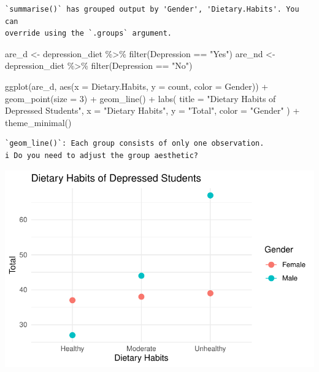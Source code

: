 \documentclass[
  letterpaper,
  DIV=11,
  numbers=noendperiod]{scrartcl}
\newenvironment{Shaded}{\begin{snugshade}}{\end{snugshade}}
\newcommand{\AttributeTok}[1]{\textcolor[rgb]{0.40,0.45,0.13}{#1}}
\newcommand{\DecValTok}[1]{\textcolor[rgb]{0.68,0.00,0.00}{#1}}
\newcommand{\FunctionTok}[1]{\textcolor[rgb]{0.28,0.35,0.67}{#1}}
\newcommand{\NormalTok}[1]{\textcolor[rgb]{0.00,0.23,0.31}{#1}}
\newcommand{\OtherTok}[1]{\textcolor[rgb]{0.00,0.23,0.31}{#1}}
\newcommand{\SpecialCharTok}[1]{\textcolor[rgb]{0.37,0.37,0.37}{#1}}
\newcommand{\StringTok}[1]{\textcolor[rgb]{0.13,0.47,0.30}{#1}}
\begin{document}
\begin{verbatim}
`summarise()` has grouped output by 'Gender', 'Dietary.Habits'. You can
override using the `.groups` argument.
\end{verbatim}

\begin{Shaded}
\begin{Highlighting}[]
\NormalTok{are\_d }\OtherTok{\textless{}{-}}\NormalTok{ depression\_diet }\SpecialCharTok{\%\textgreater{}\%} \FunctionTok{filter}\NormalTok{(Depression }\SpecialCharTok{==} \StringTok{"Yes"}\NormalTok{)}
\NormalTok{are\_nd }\OtherTok{\textless{}{-}}\NormalTok{ depression\_diet }\SpecialCharTok{\%\textgreater{}\%} \FunctionTok{filter}\NormalTok{(Depression }\SpecialCharTok{==} \StringTok{"No"}\NormalTok{)}

\FunctionTok{ggplot}\NormalTok{(are\_d, }\FunctionTok{aes}\NormalTok{(}\AttributeTok{x =}\NormalTok{ Dietary.Habits, }\AttributeTok{y =}\NormalTok{ count, }\AttributeTok{color =}\NormalTok{ Gender)) }\SpecialCharTok{+}
  \FunctionTok{geom\_point}\NormalTok{(}\AttributeTok{size =} \DecValTok{3}\NormalTok{) }\SpecialCharTok{+}    
  \FunctionTok{geom\_line}\NormalTok{() }\SpecialCharTok{+}       
  \FunctionTok{labs}\NormalTok{(}
    \AttributeTok{title =} \StringTok{"Dietary Habits of Depressed Students"}\NormalTok{,}
    \AttributeTok{x =} \StringTok{"Dietary Habits"}\NormalTok{,}
    \AttributeTok{y =} \StringTok{"Total"}\NormalTok{,}
    \AttributeTok{color =} \StringTok{"Gender"}
\NormalTok{  ) }\SpecialCharTok{+}
  \FunctionTok{theme\_minimal}\NormalTok{() }
\end{Highlighting}
\end{Shaded}

\begin{verbatim}
`geom_line()`: Each group consists of only one observation.
i Do you need to adjust the group aesthetic?
\end{verbatim}

\includegraphics{Data_files/figure-pdf/unnamed-chunk-7-1.pdf}
\end{document}
